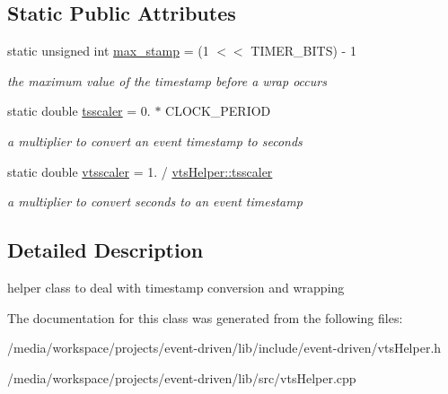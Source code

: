 \subsection*{Static Public Attributes}
\begin{DoxyCompactItemize}
\item 
\mbox{\label{classev_1_1vtsHelper_a059fdcf455b471e69446e565ed017f65}} 
static unsigned int \hyperlink{classev_1_1vtsHelper_a059fdcf455b471e69446e565ed017f65}{max\+\_\+stamp} = (1 $<$$<$ T\+I\+M\+E\+R\+\_\+\+B\+I\+TS) -\/ 1
\begin{DoxyCompactList}\small\item\em the maximum value of the timestamp before a wrap occurs \end{DoxyCompactList}\item 
\mbox{\label{classev_1_1vtsHelper_ad3ad427d18c24f9655bbc73295abf678}} 
static double \hyperlink{classev_1_1vtsHelper_ad3ad427d18c24f9655bbc73295abf678}{tsscaler} = 0. $\ast$ C\+L\+O\+C\+K\+\_\+\+P\+E\+R\+I\+OD
\begin{DoxyCompactList}\small\item\em a multiplier to convert an event timestamp to seconds \end{DoxyCompactList}\item 
\mbox{\label{classev_1_1vtsHelper_afa2dd46ae7113668bc6ebea88ab8fa11}} 
static double \hyperlink{classev_1_1vtsHelper_afa2dd46ae7113668bc6ebea88ab8fa11}{vtsscaler} = 1. / \hyperlink{classev_1_1vtsHelper_ad3ad427d18c24f9655bbc73295abf678}{vts\+Helper\+::tsscaler}
\begin{DoxyCompactList}\small\item\em a multiplier to convert seconds to an event timestamp \end{DoxyCompactList}\end{DoxyCompactItemize}


\subsection{Detailed Description}
helper class to deal with timestamp conversion and wrapping 

The documentation for this class was generated from the following files\+:\begin{DoxyCompactItemize}
\item 
/media/workspace/projects/event-\/driven/lib/include/event-\/driven/vts\+Helper.\+h\item 
/media/workspace/projects/event-\/driven/lib/src/vts\+Helper.\+cpp\end{DoxyCompactItemize}
